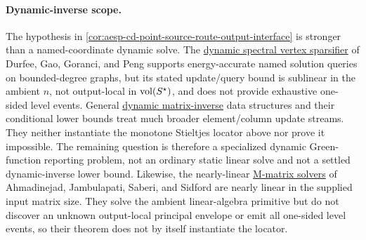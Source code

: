 \paragraph{Dynamic-inverse scope.}
The hypothesis in
\cref{cor:aesp-cd-point-source-route-output-interface} is stronger than a
named-coordinate dynamic solve.  The
\href{https://arxiv.org/abs/1906.10530}{dynamic spectral vertex sparsifier}
of Durfee, Gao, Goranci, and Peng supports energy-accurate named solution
queries on bounded-degree graphs, but its stated update/query bound is
sublinear in the ambient \(n\), not output-local in \(\operatorname{vol}(S^\star)\), and
does not provide exhaustive one-sided level events.  General
\href{https://arxiv.org/abs/1905.05067}{dynamic matrix-inverse}
data structures and their conditional lower bounds treat much broader
element/column update streams.  They neither instantiate the monotone
Stieltjes locator above nor prove it impossible.  The remaining question is
therefore a specialized dynamic Green-function reporting problem, not an
ordinary static linear solve and not a settled dynamic-inverse lower bound.
Likewise, the nearly-linear
\href{https://arxiv.org/abs/1810.02348}{M-matrix solvers} of Ahmadinejad,
Jambulapati, Saberi, and Sidford are nearly linear in the supplied input
matrix size.  They solve the ambient linear-algebra primitive but do not
discover an unknown output-local principal envelope or emit all one-sided
level events, so their theorem does not by itself instantiate the locator.

